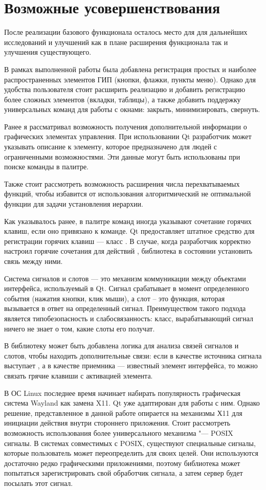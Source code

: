 \section{Возможные усовершенствования}

После реализации базового функционала осталось место для для дальнейших
исследований и улучшений как в плане расширения функционала так и улучшения
существующего.

В рамках выполненной работы была добавлена регистрация простых и наиболее
распространенных элементов ГИП (кнопки, флажки, пункты меню). Однако для
удобства пользователя стоит расширить реализацию и добавить регистрацию более
сложных элементов (вкладки, таблицы), а также добавить поддержку универсальных
команд для работы с окнами: закрыть, минимизировать, свернуть.

Ранее я рассматривал \cite{polshakovvoice} возможность получения дополнительной
информации о графических элементах управления. При использовании Qt разработчик
может указывать описание к элементу, которое предназначено для людей с
ограниченными возможностями. Эти данные могут быть использованы при поиске
команды в палитре.

Также стоит рассмотреть возможность расширения числа перехватываемых функций,
чтобы избавится от использования алгоритмический не оптимальной функции для
задачи установления иерархии.

Как указывалось ранее, в палитре команд иногда указывают сочетание горячих
клавиш, если оно привязано к команде. Qt предоставляет штатное средство для
регистрации горячих клавиш — класс . В случае, когда разработчик
корректно настроил горячие сочетания для действий , библиотека в
состоянии установить связь между ними.

Система сигналов и слотов — это механизм коммуникации между объектами
интерфейса, используемый в Qt. Сигнал срабатывает в момент определенного
события (нажатия кнопки, клик мыши), а слот – это функция, которая вызывается
в ответ на определенный сигнал. Преимуществом такого подхода является
типобезопасность и слабосвязанность: класс, вырабатывающий сигнал ничего не
знает о том, какие слоты его получат.

В библиотеку может быть добавлена логика для анализа связей сигналов и слотов,
чтобы находить дополнительные связи: если в качестве источника сигнала выступает
, а в качестве приемника — известный элемент интерфейса, то
можно связать грячие клавиши с активацией элемента.

В ОС Linux последнее время начинает набирать популярность графическая система
Wayland как замена X11\cite{wayland}. Qt уже адаптирован для работы с ним.
Однако решение, представленное в данной работе опирается на механизмы Х11 для
инициации действия внутри стороннего приложения. Стоит рассмотреть возможность
использования более универсального механизма "--- POSIX сигналы. В системах
совместимых с POSIX, существуют специальные сигналы, которые пользователь может
переопределить для своих целей. Они используются достаточно редко графическими
приложениями, поэтому библиотека может попытаться зарегистрировать свой обработчик
сигнала, а затем сервер будет посылать этот сигнал.
